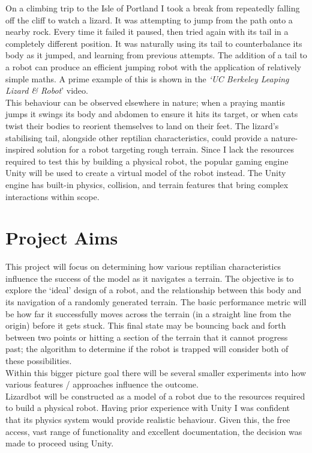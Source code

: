 \documentclass{article}
\begin{document}
On a climbing trip to the Isle of Portland I took a break from repeatedly falling off the cliff to watch a lizard. It was attempting to jump from the path onto a nearby rock. Every time it failed it paused, then tried again with its tail in a completely different position. It was naturally using its tail to counterbalance its body as it jumped, and learning from previous attempts. The addition of a tail to a robot can produce an efficient jumping robot with the application of relatively simple maths. A prime example of this is shown in the \textit{‘UC Berkeley Leaping Lizard \& Robot}’ video.\\  This behaviour can be observed elsewhere in nature; when a praying mantis jumps it swings its body and abdomen to ensure it hits its target,   or when cats twist their bodies to reorient themselves to land on their feet. 
The lizard’s stabilising tail, alongside other reptilian characteristics, could provide a nature-inspired solution for a robot targeting rough terrain. Since I lack the resources required to test this by building a physical robot, the popular gaming engine Unity  will be used to create a virtual model of the robot instead. The Unity engine has built-in physics, collision, and terrain features that bring complex interactions within scope.


\newpage
\section{Project Aims}
\label{sec:Project Aims}
This project will focus on determining how various reptilian characteristics influence the success of the model as it navigates a terrain. The objective is to explore the ‘ideal’ design of a robot, and the relationship between this body and its navigation of a randomly generated terrain. The basic performance metric will be how far it successfully moves across the terrain (in a straight line from the origin) before it gets stuck. This final state may be bouncing back and forth between two points or hitting a section of the terrain that it cannot progress past; the algorithm to determine if the robot is trapped will consider both of these possibilities. \\
Within this bigger picture goal there will be several smaller experiments into how various features / approaches influence the outcome. \\

Lizardbot will be constructed as a model of a robot due to the resources required to build a physical robot. Having prior experience with Unity  I was confident that its physics system would provide realistic behaviour. Given this, the free access, vast range of functionality and excellent documentation, the decision was made to proceed using Unity. \\
\end{document}
